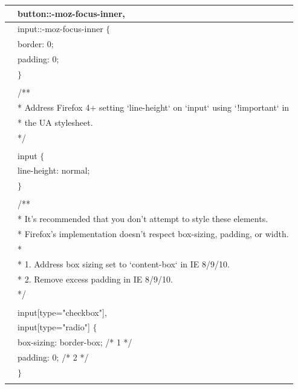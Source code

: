 \documentclass{article} %
\begin{document}
\begin{tabular}{|p{0.4in}|p{3.7in}|}
 & button::-moz-focus-inner, \\ \hline 
 & input::-moz-focus-inner $\mathrm{\{}$ \\ \hline 
 &   border: 0; \\ \hline 
 &   padding: 0; \\ \hline 
 & $\mathrm{\}}$ \\ \hline 
 & \newline  \\ \hline 
 & /** \\ \hline 
 &  * Address Firefox 4+ setting `line-height` on `input` using `!important` in \\ \hline 
 &  * the UA stylesheet. \\ \hline 
 &  */ \\ \hline 
 & \newline  \\ \hline 
 & input $\mathrm{\{}$ \\ \hline 
 &   line-height: normal; \\ \hline 
 & $\mathrm{\}}$ \\ \hline 
 & \newline  \\ \hline 
 & /** \\ \hline 
 &  * It's recommended that you don't attempt to style these elements. \\ \hline 
 &  * Firefox's implementation doesn't respect box-sizing, padding, or width. \\ \hline 
 &  * \\ \hline 
 &  * 1. Address box sizing set to `content-box` in IE 8/9/10. \\ \hline 
 &  * 2. Remove excess padding in IE 8/9/10. \\ \hline 
 &  */ \\ \hline 
 & \newline  \\ \hline 
 & input[type="checkbox"], \\ \hline 
 & input[type="radio"] $\mathrm{\{}$ \\ \hline 
 &   box-sizing: border-box; /* 1 */ \\ \hline 
 &   padding: 0; /* 2 */ \\ \hline 
 & $\mathrm{\}}$ \\ \hline 
 &  \\ \hline 
\end{tabular}



\noindent 
\end{document}
